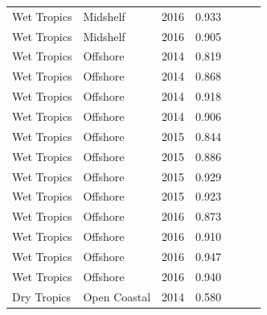 \begin{longtable}{llccccc}
  Wet Tropics & Midshelf & 2016 & 0.933 & \cellcolor[HTML]{00734D}{A} & \cellcolor[HTML]{00734D}{A} & \cellcolor[HTML]{00734D}{A} \\ 
  Wet Tropics & Midshelf & 2016 & 0.905 & \cellcolor[HTML]{00734D}{A} & \cellcolor[HTML]{00734D}{A} & \cellcolor[HTML]{00734D}{A} \\ 
  Wet Tropics & Offshore & 2014 & 0.819 & \cellcolor[HTML]{B0D235}{B} & \cellcolor[HTML]{00734D}{A} & \cellcolor[HTML]{B0D235}{B} \\ 
  Wet Tropics & Offshore & 2014 & 0.868 & \cellcolor[HTML]{00734D}{A} & \cellcolor[HTML]{00734D}{A} & \cellcolor[HTML]{00734D}{A} \\ 
  Wet Tropics & Offshore & 2014 & 0.918 & \cellcolor[HTML]{00734D}{A} & \cellcolor[HTML]{00734D}{A} & \cellcolor[HTML]{00734D}{A} \\ 
  Wet Tropics & Offshore & 2014 & 0.906 & \cellcolor[HTML]{00734D}{A} & \cellcolor[HTML]{00734D}{A} & \cellcolor[HTML]{00734D}{A} \\ 
  Wet Tropics & Offshore & 2015 & 0.844 & \cellcolor[HTML]{00734D}{A} & \cellcolor[HTML]{00734D}{A} & \cellcolor[HTML]{B0D235}{B} \\ 
  Wet Tropics & Offshore & 2015 & 0.886 & \cellcolor[HTML]{00734D}{A} & \cellcolor[HTML]{00734D}{A} & \cellcolor[HTML]{00734D}{A} \\ 
  Wet Tropics & Offshore & 2015 & 0.929 & \cellcolor[HTML]{00734D}{A} & \cellcolor[HTML]{00734D}{A} & \cellcolor[HTML]{00734D}{A} \\ 
  Wet Tropics & Offshore & 2015 & 0.923 & \cellcolor[HTML]{00734D}{A} & \cellcolor[HTML]{00734D}{A} & \cellcolor[HTML]{00734D}{A} \\ 
  Wet Tropics & Offshore & 2016 & 0.873 & \cellcolor[HTML]{00734D}{A} & \cellcolor[HTML]{00734D}{A} & \cellcolor[HTML]{00734D}{A} \\ 
  Wet Tropics & Offshore & 2016 & 0.910 & \cellcolor[HTML]{00734D}{A} & \cellcolor[HTML]{00734D}{A} & \cellcolor[HTML]{00734D}{A} \\ 
  Wet Tropics & Offshore & 2016 & 0.947 & \cellcolor[HTML]{00734D}{A} & \cellcolor[HTML]{00734D}{A} & \cellcolor[HTML]{00734D}{A} \\ 
  Wet Tropics & Offshore & 2016 & 0.940 & \cellcolor[HTML]{00734D}{A} & \cellcolor[HTML]{00734D}{A} & \cellcolor[HTML]{00734D}{A} \\ 
  Dry Tropics & Open Coastal & 2014 & 0.580 & \cellcolor[HTML]{F0C918}{C} & \cellcolor[HTML]{F0C918}{C} & \cellcolor[HTML]{F0C918}{C} \\ 

\end{longtable}
